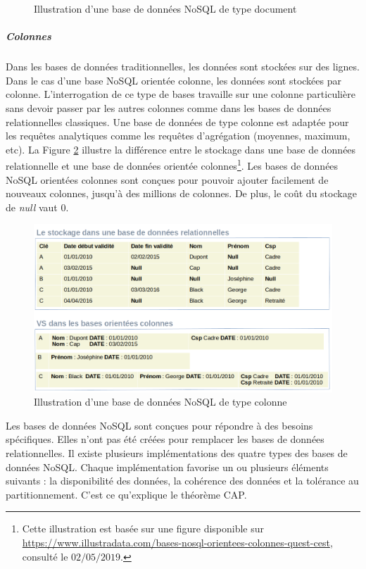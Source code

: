 		\begin{figure}[h]
			\centering
				\resizebox{\textwidth}{!}{
			
		}
			\caption{Illustration d'une base de données NoSQL de type document}
			\label{fig:document-nosql}
		\end{figure}
		\subparagraph{Colonnes} Dans les bases de données traditionnelles, les données sont stockées sur des lignes. Dans le cas d'une base NoSQL orientée colonne, les données sont stockées par colonne. L'interrogation de ce type de bases travaille sur une colonne particulière sans devoir passer par les autres colonnes comme dans les bases de données relationnelles classiques. Une base de données de type colonne est adaptée pour les requêtes analytiques comme les requêtes d'agrégation (moyennes, maximum, etc). La Figure \ref{fig:comomn-nosql} illustre la différence entre le stockage dans une base de données relationnelle et une base de données orientée colonnes\footnote{Cette illustration  est basée sur une figure disponible sur \url{https://www.illustradata.com/bases-nosql-orientees-colonnes-quest-cest}, consulté le $02/05/2019$.}. 
		Les bases de données NoSQL orientées colonnes sont conçues pour pouvoir ajouter facilement de nouveaux colonnes, jusqu'à des millions de colonnes. De plus, le coût du stockage de \textit{null} vaut $ 0 $.
		
	\begin{figure}[h]
		\centering
		\includegraphics[width=\linewidth]{illustrations/colomn-db-2.png}
		\caption{Illustration d'une base de données NoSQL de type colonne}
		\label{fig:comomn-nosql}
	\end{figure}


Les bases de données NoSQL sont conçues pour répondre à des besoins spécifiques. Elles n'ont pas été créées pour remplacer les bases de données relationnelles. Il existe plusieurs implémentations des quatre types des bases de données NoSQL. Chaque implémentation favorise un ou plusieurs  éléments suivants : la disponibilité des données, la cohérence des données et la tolérance au partitionnement.  C'est ce qu'explique le théorème CAP.	
